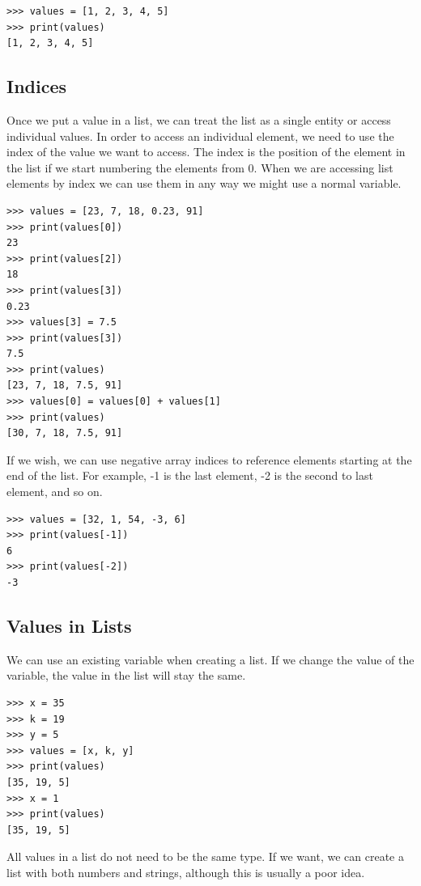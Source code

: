 \documentclass[11pt]{cselabheader}
\begin{document}
\begin{lstlisting}[style=ipython]
>>> values = [1, 2, 3, 4, 5]
>>> print(values)
[1, 2, 3, 4, 5]
\end{lstlisting}

\subsection{Indices}
Once we put a value in a list, we can treat the list as a single entity or
access individual values. In order to access an individual element, we need to
use the index of the value we want to access. The index is the position of the
element in the list if we start numbering the elements from 0. When we are
accessing list elements by index we can use them in any way we might use a
normal variable.

\begin{lstlisting}[style=ipython]
>>> values = [23, 7, 18, 0.23, 91]
>>> print(values[0])
23
>>> print(values[2])
18
>>> print(values[3])
0.23
>>> values[3] = 7.5
>>> print(values[3])
7.5
>>> print(values)
[23, 7, 18, 7.5, 91]
>>> values[0] = values[0] + values[1]
>>> print(values)
[30, 7, 18, 7.5, 91]
\end{lstlisting}

If we wish, we can use negative array indices to reference elements starting at
the end of the list. For example, -1 is the last element, -2 is the second to
last element, and so on.

\begin{lstlisting}[style=ipython]
>>> values = [32, 1, 54, -3, 6]
>>> print(values[-1])
6
>>> print(values[-2])
-3
\end{lstlisting}

\subsection{Values in Lists}
We can use an existing variable when creating a list. If we change the value of
the variable, the value in the list will stay the same.

\begin{lstlisting}[style=ipython]
>>> x = 35
>>> k = 19
>>> y = 5
>>> values = [x, k, y]
>>> print(values)
[35, 19, 5]
>>> x = 1
>>> print(values)
[35, 19, 5]
\end{lstlisting}

All values in a list do not need to be the same type. If we want, we can create
a list with both numbers and strings, although this is usually a poor idea.
\end{document}

